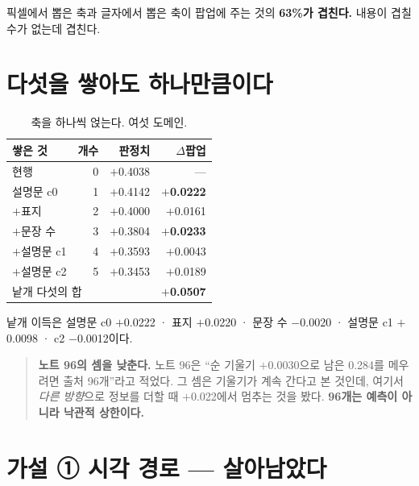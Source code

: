 \documentclass[10pt]{article}
\begin{document}
픽셀에서 뽑은 축과 글자에서 뽑은 축이 팝업에 주는 것의 \textbf{63\%가 겹친다.}
내용이 겹칠 수가 없는데 겹친다.

\section{다섯을 쌓아도 하나만큼이다}

\begin{table}[t]
\centering\tsize
\caption{축을 하나씩 얹는다. 여섯 도메인.}
\begin{tabular}{lrrr}
\toprule
쌓은 것 & 개수 & 판정치 & $\Delta$팝업 \\
\midrule
현행 & 0 & $+$0.4038 & --- \\
설명문 c0 & 1 & $+$0.4142 & \textbf{$+$0.0222} \\
$+$표지 & 2 & $+$0.4000 & $+$0.0161 \\
$+$문장 수 & 3 & $+$0.3804 & \textbf{$+$0.0233} \\
$+$설명문 c1 & 4 & $+$0.3593 & $+$0.0043 \\
$+$설명문 c2 & 5 & $+$0.3453 & $+$0.0189 \\
\midrule
\multicolumn{2}{l}{낱개 다섯의 합} & & \textbf{$+$0.0507} \\
\bottomrule
\end{tabular}
\end{table}

낱개 이득은 설명문 c0 $+$0.0222 · 표지 $+$0.0220 · 문장 수 $-$0.0020 ·
설명문 c1 $+$0.0098 · c2 $-$0.0012이다.


\begin{quote}\fontsize{9.5}{11.5}\selectfont
\textbf{노트 96의 셈을 낮춘다.} 노트 96은 ``순 기울기 $+$0.0030으로 남은
0.284를 메우려면 출처 96개''라고 적었다. 그 셈은 기울기가 계속 간다고 본
것인데, 여기서 \emph{다른 방향}으로 정보를 더할 때 $+$0.022에서 멈추는 것을
봤다. \textbf{96개는 예측이 아니라 낙관적 상한이다.}
\end{quote}

\section{가설 ① 시각 경로 --- 살아남았다}
\end{document}
